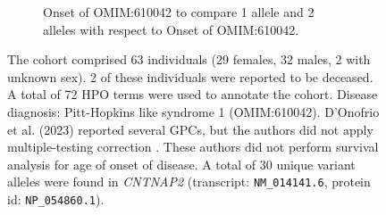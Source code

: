 \begin{figure}[htbp]
\vspace{2em}

\begin{subfigure}[b]{0.95\textwidth}
\captionsetup{justification=raggedright,singlelinecheck=false}
\caption{Onset of OMIM:610042 to compare 1 allele and 2 alleles with respect to Onset of OMIM:610042.}
\end{subfigure}

\vspace{2em}

\caption{The cohort comprised 63 individuals (29 females, 32 males, 2 with unknown sex). 
2 of these individuals were reported to be deceased. A total of 72 HPO terms were used to 
annotate the cohort. Disease diagnosis: Pitt-Hopkins like syndrome 1 (OMIM:610042). 
D'Onofrio et al. (2023) reported several GPCs, but the authors did not
apply multiple-testing correction \cite{PMID_37183190}. These authors did not perform survival analysis for age of onset of disease.
A total of 30 unique variant alleles were found in \textit{CNTNAP2} (transcript: \texttt{NM\_014141.6}, protein id: \texttt{NP\_054860.1}).}
\end{figure}

